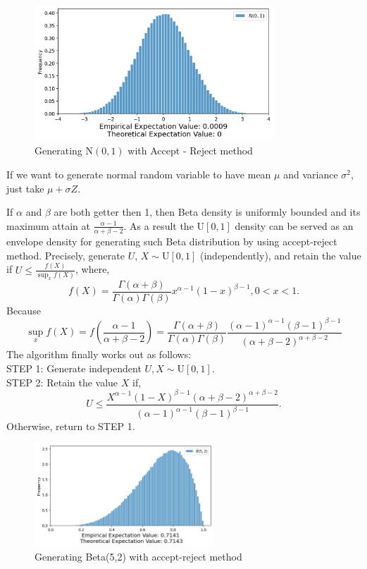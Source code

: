 \begin{example}
	\begin{figure}[H]

		\centering
		\includegraphics[width=0.8\textwidth]{images/nor_AR.png}
        \caption{Generating $\text{N}(0,1)$ with Accept - Reject method}
	\end{figure}

	If we want to generate normal random variable to have mean $\mu$  and variance $\sigma^2 $, just take $\mu +\sigma Z $.
\end{example}

\begin{example}
	\label{generate beta}
	If $\alpha$ and  $\beta $ are both getter then 1, then Beta density is uniformly bounded and its maximum attain at
    $\frac{\alpha-1}{\alpha+\beta-2}$. As a result the $\text{U}[0,1]$ density can be served as an envelope density for generating such Beta distribution by using accept-reject method.
    Precisely, generate $U$, $X\sim \text{U}[0,1]$ (independently), and retain the value if
	$U\le \frac{f(X)}{\sup_x f(X)}$, where,
	\[
		f(X)=\frac{\Gamma(\alpha+\beta)}{\Gamma(\alpha)\Gamma(\beta)}x^{\alpha-1} (1-x)^{\beta-1}, 0 < x< 1.
	\]
	Because
	\[
		\sup_x f(X) = f\left( \frac{\alpha-1}{\alpha+\beta-2} \right) = \frac{\Gamma(\alpha+\beta)}{\Gamma(\alpha)\Gamma(\beta)}\frac{(\alpha-1)^{\alpha-1} (\beta-1)^{\beta-1} }{(\alpha+\beta-2)^{\alpha+\beta-2} }
	\]
	The algorithm finally works out as follows:\\
    STEP 1: Generate independent $U,X \sim \text{U}[0,1]$.\\
	STEP 2: Retain the value $X$ if,
	\[
		U \le \frac{X^{\alpha-1} (1-X)^{\beta -1} (\alpha+\beta-2)^{\alpha+\beta-2} }{(\alpha-1)^{\alpha-1} (\beta-1)^{\beta-1} }.
	\]
	Otherwise, return to STEP 1.

	\begin{figure}[H]
		\centering
		\includegraphics[width=0.6\textwidth]{images/beta_AR.png}
		\caption{Generating Beta(5,2) with accept-reject method}
		\label{Beta 5 2}
	\end{figure}
\end{example}

